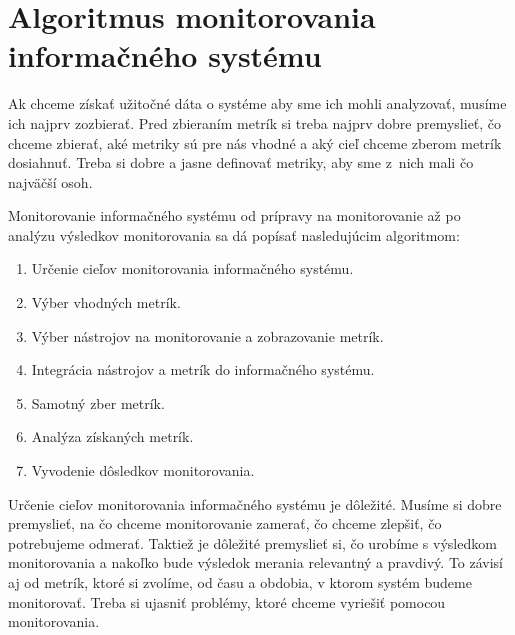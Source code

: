 \documentclass[a4paper, usesections, upjsfrontpage, thesismargins, thesislinespacing]{rnthesis}
\begin{document}
\newpage



\section{Algoritmus monitorovania informačného systému}

Ak chceme získať užitočné dáta o systéme aby sme ich mohli analyzovať, musíme ich najprv zozbierať.
Pred zbieraním metrík si treba najprv dobre premyslieť, čo chceme zbierať, 
aké metriky sú pre nás vhodné a aký cieľ chceme zberom metrík dosiahnuť.
Treba si dobre a jasne definovať metriky, aby sme z~nich mali čo najväčší osoh.


Monitorovanie informačného systému od prípravy na monitorovanie až po analýzu výsledkov monitorovania sa dá popísať nasledujúcim algoritmom:

\begin{enumerate}
	\item Určenie cieľov monitorovania informačného systému.
	\item Výber vhodných metrík.
	\item Výber nástrojov na monitorovanie a zobrazovanie metrík.
	\item Integrácia nástrojov a metrík do informačného systému.
	\item Samotný zber metrík.
	\item Analýza získaných metrík.
	\item Vyvodenie dôsledkov monitorovania.
\end{enumerate}

Určenie cieľov monitorovania informačného systému je dôležité.
Musíme si dobre premyslieť, na čo chceme monitorovanie zamerať, čo chceme zlepšiť, čo potrebujeme odmerať.
Taktiež je dôležité premyslieť si, čo urobíme s výsledkom monitorovania a nakoľko bude výsledok merania relevantný a pravdivý.
To závisí aj od metrík, ktoré si zvolíme, od času a obdobia, v ktorom systém budeme monitorovať.
Treba si ujasniť problémy, ktoré chceme vyriešiť pomocou monitorovania.
\end{document}
